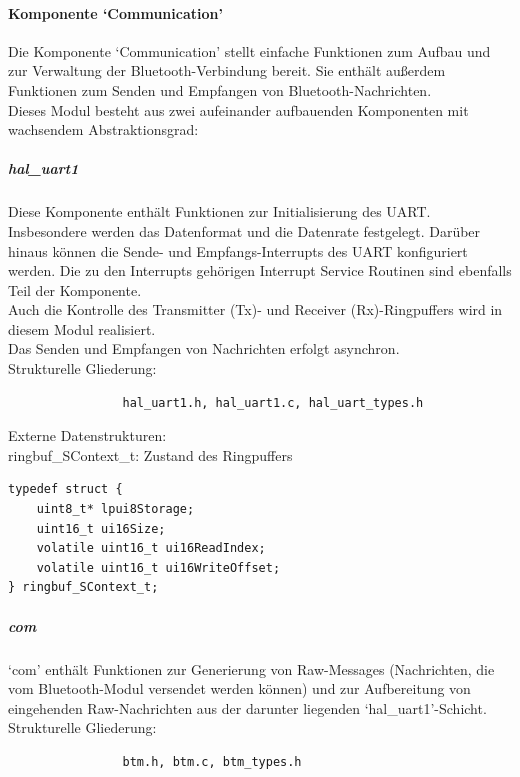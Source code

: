 \documentclass[10pt,a4paper]{article}
\begin{document}
			\paragraph*{Komponente `Communication'}
			Die Komponente `Communication' stellt einfache Funktionen zum Aufbau und zur Verwaltung  der Bluetooth-Verbindung bereit.
			Sie enthält außerdem Funktionen zum Senden und Empfangen von Bluetooth-Nachrichten.\\
			 
			Dieses Modul besteht aus zwei aufeinander aufbauenden Komponenten mit wachsendem Abstraktionsgrad:
			
				\subparagraph*{hal\_uart1}
				Diese Komponente enthält Funktionen zur Initialisierung des UART. Insbesondere werden das Datenformat und die Datenrate festgelegt.
				Darüber hinaus können die Sende- und Empfangs-Interrupts des UART konfiguriert werden. Die zu den Interrupts gehörigen Interrupt
				Service Routinen sind ebenfalls Teil der Komponente. \\
				Auch die Kontrolle des Transmitter (Tx)- und Receiver (Rx)-Ringpuffers wird in diesem Modul realisiert. \\
				Das Senden und Empfangen von Nachrichten erfolgt asynchron. \\
				
				Strukturelle Gliederung:
				\begin{verbatim}  
				hal_uart1.h, hal_uart1.c, hal_uart_types.h
				\end{verbatim}
				
				Externe Datenstrukturen: \\
				ringbuf\_SContext\_t: Zustand des Ringpuffers
				
				\lstset{language = C, tabsize = 4}
				\begin{lstlisting}[captionpos=b, caption={ringbuf\_SContext\_t}, frame = single]
typedef struct {
	uint8_t* lpui8Storage;
	uint16_t ui16Size;
	volatile uint16_t ui16ReadIndex;
	volatile uint16_t ui16WriteOffset;
} ringbuf_SContext_t;
				\end{lstlisting}
				
				\subparagraph*{com}
				`com' enthält Funktionen zur Generierung von Raw-Messages (Nachrichten, die vom Bluetooth-Modul versendet werden
				können) und zur Aufbereitung von eingehenden Raw-Nachrichten aus der darunter liegenden `hal\_uart1'-Schicht. \\
				
				Strukturelle Gliederung:
				\begin{verbatim}  
				btm.h, btm.c, btm_types.h
				\end{verbatim}
				
\end{document}
